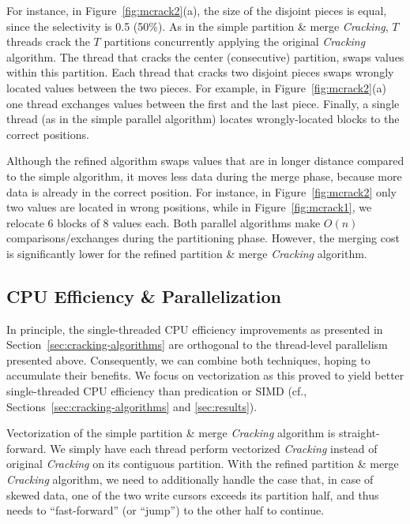 For instance, in Figure~\ref{fig:mcrack2}(a), the size of the disjoint pieces is equal, since the selectivity is 0.5 (50\%).
As in the simple partition \& merge \emph{Cracking}, $T$ threads
crack the $T$ partitions concurrently applying the original \emph{Cracking} algorithm.  
The thread that cracks the center (consecutive) partition, swaps values within this partition.
Each thread that cracks two disjoint pieces swaps wrongly located values between the
two pieces.  For example, in Figure~\ref{fig:mcrack2}(a) one thread exchanges values between the first and the last piece.
Finally, a single thread (as in the simple parallel algorithm) locates wrongly-located blocks to the correct positions.

Although the refined algorithm swaps values that are in longer
distance compared to the simple algorithm, it moves less data during
the merge phase, because more data is already in the correct position.
For instance, in Figure~\ref{fig:mcrack2} only two values are located in wrong positions, while in Figure~\ref{fig:mcrack1}, we relocate 6 blocks of 8 values each.
Both parallel algorithms make $O(n)$ comparisons/exchanges during the partitioning phase.
However, the merging cost is significantly lower for the refined partition \& merge \emph{Cracking} algorithm.  


\subsection*{CPU Efficiency \& Parallelization}

In principle, the single-threaded CPU efficiency improvements as presented in
Section~\ref{sec:cracking-algorithms} are orthogonal to the thread-level
parallelism presented above. Consequently, we can combine both techniques,
hoping to accumulate their benefits. We focus on vectorization as this proved
to yield better single-threaded CPU efficiency than predication or SIMD
(cf., Sections~\ref{sec:cracking-algorithms} and \ref{sec:results}).

Vectorization of the simple partition \& merge \emph{Cracking} algorithm is
straight-forward.  We simply have each thread perform vectorized
\emph{Cracking} instead of original \emph{Cracking} on its contiguous
partition.  With the refined partition \& merge \emph{Cracking} algorithm,
we need to additionally handle the case that, in case of skewed data, one of
the two write cursors exceeds its partition half, and thus needs to
``fast-forward'' (or ``jump'') to the other half to continue.


